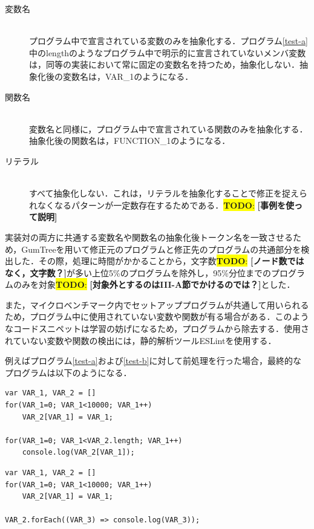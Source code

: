 \documentclass[T,J]{fose} %
\newcommand{\todo}[1]{\colorbox{yellow}{{\bf TODO}:}{\color{red} {\textbf{[#1]}}}}
\begin{document}
\begin{description}

\item[変数名]\mbox{}\\
プログラム中で宣言されている変数のみを抽象化する．プログラム\ref{test-a}中のlengthのようなプログラム中で明示的に宣言されていないメンバ変数は，同等の実装において常に固定の変数名を持つため，抽象化しない．抽象化後の変数名は，VAR\_1のようになる．

\item[関数名]\mbox{}\\
変数名と同様に，プログラム中で宣言されている関数のみを抽象化する．抽象化後の関数名は，FUNCTION\_1のようになる．

\item[リテラル]\mbox{}\\
すべて抽象化しない．これは，リテラルを抽象化することで修正を捉えられなくなるパターンが一定数存在するためである．\todo{事例を使って説明}

\end{description}


実装対の両方に共通する変数名や関数名の抽象化後トークン名を一致させるため，GumTree\cite{Falleri_2014}を用いて修正元のプログラムと修正先のプログラムの共通部分を検出した．その際，処理に時間がかかることから，文字数\todo{ノード数ではなく，文字数？}が多い上位5\%のプログラムを除外し，95\%分位までのプログラムのみを対象\todo{対象外とするのはIII-A節でかけるのでは？}とした．

また，マイクロベンチマーク内でセットアッププログラムが共通して用いられるため，プログラム中に使用されていない変数や関数が有る場合がある．このようなコードスニペットは学習の妨げになるため，プログラムから除去する．使用されていない変数や関数の検出には，静的解析ツールESLintを使用する．

例えばプログラム\ref{test-a}および\ref{test-b}に対して前処理を行った場合，最終的なプログラムは以下のようになる．


\begin{lstlisting}[caption=Abstracted Program 1, label=abstract-a,captionpos=t]
var VAR_1, VAR_2 = []
for(VAR_1=0; VAR_1<10000; VAR_1++)
    VAR_2[VAR_1] = VAR_1;

for(VAR_1=0; VAR_1<VAR_2.length; VAR_1++)
    console.log(VAR_2[VAR_1]);
\end{lstlisting}

\begin{lstlisting}[caption=Abstracted Program 2, label=abstract-b,captionpos=t]
var VAR_1, VAR_2 = []
for(VAR_1=0; VAR_1<10000; VAR_1++)
    VAR_2[VAR_1] = VAR_1;

VAR_2.forEach((VAR_3) => console.log(VAR_3));
\end{lstlisting}
\end{document}
